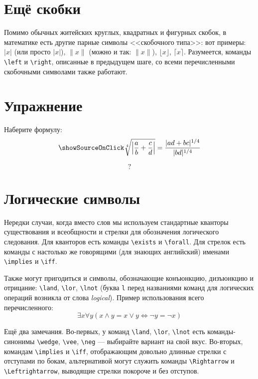 \section{Ещё скобки}
\par Помимо обычных житейских круглых, квадратных и фигурных скобок, в математике есть другие парные символы <<скобочного типа>>: вот примеры: \( \lvert x \rvert \) (или просто \( |x| \)), \( \lVert x \rVert \) (можно и так: \( \| x \| \)), \( \lfloor x \rfloor \), \( \lceil x \rceil\). Разумеется, команды \verb"\left" и \verb"\right", описанные в предыдущем шаге, со всеми перечисленными скобочными символами также работают.

\section{Упражнение}
\begin{staticpart}
Наберите формулу: \[\showSourceOnClick \sqrt[4]{\left\lvert\frac{a}{b}+\frac{c}{d}\right\rvert}=\frac{|ad+bc|^{1/4}}{|bd|^{1/4}}\]
\end{staticpart}
\[?\]

\section{Логические символы}
\par Нередки случаи, когда вместо слов мы используем стандартные кванторы существования и всеобщности и стрелки для обозначения логического следования. Для кванторов есть команды \verb"\exists" и \verb"\forall". Для стрелок есть команды с настолько же говорящими (для знающих английский) именами \verb"\implies" и \verb"\iff".
\par Также могут пригодиться и символы, обозначающие конъюнкцию, дизъюнкцию и отрицание: \verb"\land", \verb"\lor", \verb"\lnot" (буква \verb"l" перед названиями команд для логических операций возникла от слова \emph{logical}). Пример использования всего перечисленного: \[ \exists x \forall y (x\land y=x\lor y \iff \lnot y=\lnot x) \]
\par Ещё два замечания. Во-первых, у команд \verb"\land", \verb"\lor", \verb"\lnot" есть команды-синонимы \verb"\wedge", \verb"\vee", \verb"\neg" --- выбирайте вариант на свой вкус. Во-вторых, командам \verb"\implies" и \verb"\iff", отображающим довольно длинные стрелки с отступами по бокам, альтернативой могут служить команды \verb"\Rightarrow" и \verb"\Leftrightarrow", выводящие стрелки покороче и без отступов.\index{\Rightarrow,\Leftrightarrow}

